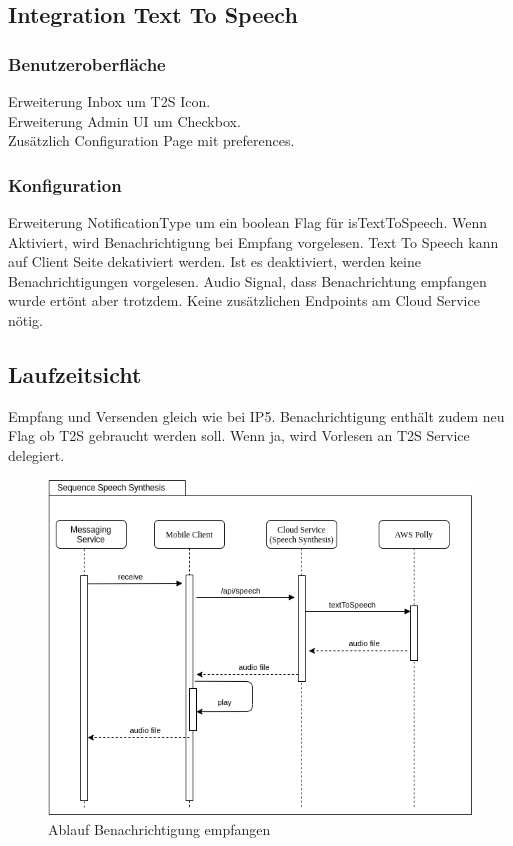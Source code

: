 


\subsection{Integration Text To Speech}

\subsubsection*{Benutzeroberfläche}

Erweiterung Inbox um T2S Icon. \\
Erweiterung Admin UI um Checkbox. \\
Zusätzlich Configuration Page mit preferences. \\

\subsubsection*{Konfiguration}
Erweiterung NotificationType um ein boolean Flag für isTextToSpeech.
Wenn Aktiviert, wird Benachrichtigung bei Empfang vorgelesen.
Text To Speech kann auf Client Seite dekativiert werden.
Ist es deaktiviert, werden keine Benachrichtigungen vorgelesen.
Audio Signal, dass Benachrichtung empfangen wurde ertönt aber trotzdem.
Keine zusätzlichen Endpoints am Cloud Service nötig. \\


\subsection*{Laufzeitsicht}

Empfang und Versenden gleich wie bei IP5.
Benachrichtigung enthält zudem neu Flag ob T2S gebraucht werden soll.
Wenn ja, wird Vorlesen an T2S Service delegiert.

\begin{figure}[h]
    \centering
    \begin{minipage}[b]{0.9\textwidth}
        \includegraphics[width=\textwidth]{graphics/diagramms/Sequence_Speech_Synth_V01}
        \caption{Ablauf Benachrichtigung empfangen}
    \end{minipage}
\end{figure}

